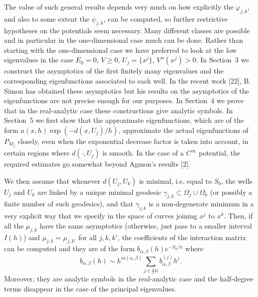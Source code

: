 \documentclass[11pt,a4paper]{article}
\newcommand{\N}{\mathbb N}
\numberwithin{equation}{section}
\theoremstyle{remark}
\begin{document}
The value of such general results depends very much on how explicitly the $\varphi_{j,k}$, and also to some extent the $\psi_{j,k}$, can be computed, so further restrictive hypotheses on the potentials seem necessary. Many different classes are possible and in particular in the one-dimensional case much can be done. Rather than starting with the one-dimensional case we have preferred to look at the low eigenvalues in the case $E_0=0$, $V\ge0$, $U_j=\{x^j\}$, $V''(x^j)>0$. In Section~3 we construct the asymptotics of the first finitely many eigenvalues and the corresponding eigenfunctions associated to each well. In the recent work [22], B. Simon has obtained these asymptotics but his results on the asymptotics of the eigenfunctions are not precise enough for our purposes. In Section~4 we prove that in the real-analytic case these constructions give analytic symbols. In Section~5 we first show that the approximate eigenfunctions, which are of the form $a(x,h)\exp(-d(x,U_j)/h)$, approximate the actual eigenfunctions of $P_{M_j}$ closely, even when the exponential decrease factor is taken into account, in certain regions where $d(\cdot,U_j)$ is smooth. In the case of a $C^\infty$ potential, the required estimates go somewhat beyond Agmon's results [2].

We then assume that whenever $d(U_j,U_k)$ is minimal, i.e. equal to $S_0$, the wells $U_j$ and $U_k$ are linked by a unique minimal geodesic $\gamma_{j,k}\subset\Omega_j\cup\Omega_k$ (or possibly a finite number of such geodesics), and that $\gamma_{j,k}$ is a non-degenerate minimum in a very explicit way that we specify in the space of curves joining $x^j$ to $x^k$. Then, if all the $\mu_{j,k}$ have the same asymptotics (otherwise, just pass to a smaller interval $I(h)$) and $\mu_{j,k}=\mu_{j,k'}$ for all $j,k,k'$, the coefficients of the interaction matrix can be computed and they are of the form $b_{\alpha,\beta}(h)e^{-S_0/h}$ where
\[
b_{\alpha,\beta}(h)\sim h^{m(\alpha,\beta)}
\sum_{j\in\frac12\N} b_{\alpha,\beta}^{(j)}h^j.
\]
Moreover, they are analytic symbols in the real-analytic case and the half-degree terms disappear in the case of the principal eigenvalues.
\end{document}
